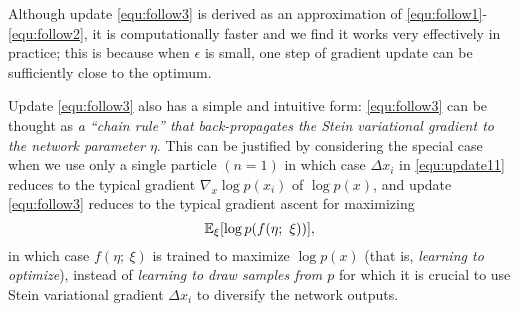 \documentclass{article} %
\begin{document}


Although update \eqref{equ:follow3} is derived as an approximation of \eqref{equ:follow1}-\eqref{equ:follow2}, 
it is computationally faster and we find it works very effectively in practice; 
this is because when $\epsilon$ is small, 
one step of gradient update can be sufficiently close to the optimum.  

Update \eqref{equ:follow3} also has a simple and intuitive form: \eqref{equ:follow3} can be thought as \emph{a ``chain rule'' that back-propagates the Stein variational gradient to the network parameter $\eta$}. 
This can be justified by considering the special case when we use only a single particle $(n=1)$ 
in which case $\Delta x_i$ in \eqref{equ:update11} reduces to the typical gradient $\nabla_x \log p(x_i)$ of $\log p(x)$, 
and update \eqref{equ:follow3} reduces to the typical gradient ascent for maximizing 
$$\mathbb{E}_{\xi}[\log p(f(\eta;~\xi))],$$  
in which case $f(\eta;~\xi)$ is trained to maximize $\log p(x)$ (that is, \emph{learning to optimize}), 
instead of \emph{learning to draw samples from $p$} for which it is crucial to use Stein variational gradient $\Delta x_i$ to diversify the network outputs. 
\end{document}
